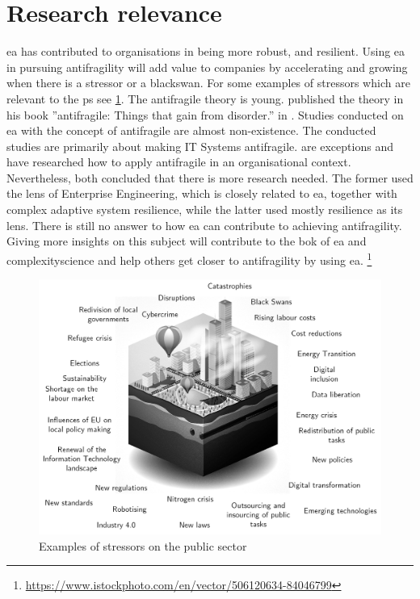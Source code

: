 \section{Research relevance}
\label{sec:researchrelevance}
\acrshort{ea} has contributed to organisations in being more \gls{robust}, and \gls{resilient}. Using \acrshort{ea} in pursuing \gls{antifragility} will add value to companies by accelerating and growing when there is a \gls{stressor} or a \gls{blackswan}. For some examples of \glspl{stressor} which are relevant to the \gls{ps} see \cref{fig:publicstressors}. The \gls{antifragile} theory is young. \citeauthor{Taleb2012} published the theory in his book ''\Gls{antifragile}: Things that gain from disorder.'' in \citeyear{Taleb2012}. Studies conducted on \acrshort{ea} with the concept of \gls{antifragile} are almost non-existence. The conducted studies are primarily about making IT Systems \gls{antifragile}. \textcites{Botjes2020}{Kastner2017} are exceptions and have researched how to apply \gls{antifragile} in an organisational context. Nevertheless, both concluded that there is more research needed. The former used the lens of Enterprise Engineering, which is closely related to \acrshort{ea}, together with complex adaptive system resilience, while the latter used mostly resilience as its lens. There is still no answer to how \acrshort{ea} can contribute to achieving \gls{antifragility}. Giving more insights on this subject will contribute to the \acrshort{bok} of \acrshort{ea} and \gls{complexityscience} and help others get closer to \gls{antifragility} by using \acrshort{ea}.
{\let\thefootnote\relax\footnote{{\url{https://www.istockphoto.com/en/vector/506120634-84046799}}}}
\begin{figure}[H]
	\centering
	\includegraphics[width=0.8\linewidth]{images/publicstressors}
	\caption[Examples of stressors on the public sector]{Examples of stressors on the public sector}
	\label{fig:publicstressors}
\end{figure}

